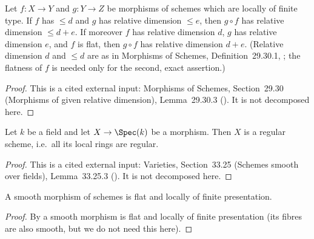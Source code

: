 \begin{lemma}
\label{lem:pc-relative-dimension-composition}
Let $f:X\to Y$ and $g:Y\to Z$ be morphisms of schemes which are locally of finite
type.  If $f$ has  $\le d$ and $g$
has relative dimension $\le e$, then $g\circ f$ has relative dimension $\le d+e$.
If moreover $f$ has relative dimension $d$, $g$ has relative dimension $e$, and
$f$ is flat, then $g\circ f$ has relative dimension $d+e$.  (Relative dimension
$d$ and $\le d$ are as in Morphisms of Schemes, Definition~29.30.1,
; the flatness of $f$ is needed only for the second, exact
assertion.)
\end{lemma}
\begin{proof}
This is a cited external input: Morphisms of Schemes, Section~29.30 (Morphisms of
given relative dimension), Lemma~29.30.3 ().  It is not
decomposed here.
\end{proof}

\begin{lemma}
\label{lem:pc-smooth-over-field-regular}
Let $k$ be a field and let $X\to\Spec(k)$ be a
 morphism.  Then $X$ is a regular scheme, i.e.\
all its local rings are regular.
\end{lemma}
\begin{proof}
This is a cited external input: Varieties, Section~33.25 (Schemes smooth over fields),
Lemma~33.25.3 (\stacksproject{056S}).  It is not decomposed here.
\end{proof}

\begin{lemma}[Smooth morphisms are flat]\label{lem:pc-smooth-flat}
A smooth morphism of schemes is flat and locally of finite
presentation.
\end{lemma}
\begin{proof}
By  a smooth morphism is flat and
locally of finite presentation (its fibres are also smooth, but we do
not need this here).
\end{proof}


